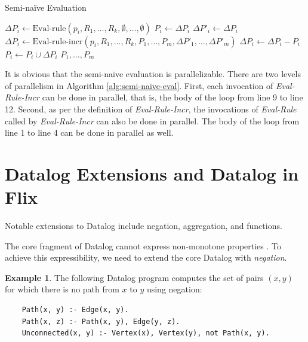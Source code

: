 \documentclass[11pt]{report}
\theoremstyle{definition}
\newtheorem{exmp}{Example}[chapter]
\begin{document}
\begin{algorithm}
  \caption{Semi-na\"ive Evaluation}
  \label{alg:semi-naive-eval}
  \begin{algorithmic}[1]
    \State $\Delta P_i \leftarrow \text{Eval-rule}(p_i, R_1, \ldots, R_k, \emptyset, \ldots, \emptyset)$
    \State $P_i \leftarrow \Delta P_i$
    \EndFor
    \Repeat
    \State $\Delta P'_i \leftarrow \Delta P_i$
    \EndFor
    \State $\Delta P_i \leftarrow \text{Eval-rule-incr}(p_i, R_1, \ldots, R_k, P_1, \ldots, P_m, \Delta P'_1, \ldots, \Delta P'_m)$
    \State $\Delta P_i \leftarrow \Delta P_i - P_i$
    \EndFor
    \State $P_i \leftarrow P_i \cup \Delta P_i$
    \EndFor
    \State \Return $P_1, \ldots, P_m$
  \end{algorithmic}
\end{algorithm}

It is obvious that the semi-naïve evaluation is parallelizable. There are two levels of parallelism in Algorithm \ref{alg:semi-naive-eval}. First, each invocation of \textit{Eval-Rule-Incr} can be done in parallel, that is, the body of the loop from line 9 to line 12. Second, as per the definition of \textit{Eval-Rule-Incr}, the invocations of \textit{Eval-Rule} called by \textit{Eval-Rule-Incr} can also be done in parallel. The body of the loop from line 1 to line 4 can be done in parallel as well.

\section{Datalog Extensions and Datalog in Flix}

Notable extensions to Datalog include negation, aggregation, and functions.

The core fragment of Datalog cannot express non-monotone properties \cite{AFRATI1995177}. To achieve this expressibility, we need to extend the core Datalog with \textit{negation}.

\begin{exmp}
  The following Datalog program computes the set of pairs $(x, y)$ for which there is no path from $x$ to $y$ using negation:
  \begin{verbatim}
    Path(x, y) :- Edge(x, y).
    Path(x, z) :- Path(x, y), Edge(y, z).
    Unconnected(x, y) :- Vertex(x), Vertex(y), not Path(x, y).
  \end{verbatim}
\end{exmp}
\end{document}
